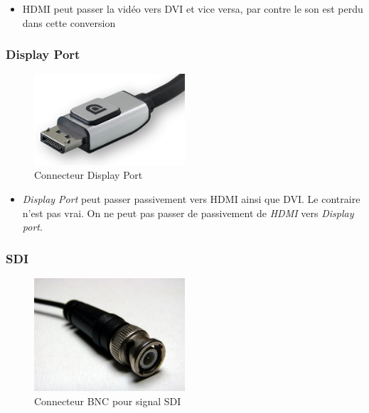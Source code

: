 \documentclass[
  french,
]{book}
\providecommand{\tightlist}{%
  \setlength{\itemsep}{0pt}\setlength{\parskip}{0pt}}
\begin{document}
\begin{itemize}
\tightlist
\item
  HDMI peut passer la vidéo vers DVI et vice versa, par contre le son est perdu dans cette conversion
\end{itemize}

\hypertarget{display-port}{%
\subsubsection{Display Port}\label{display-port}}

\begin{figure}
\centering
\includegraphics[width=0.5\textwidth,height=\textheight]{medias/lexique/signaux/numerique/displayport.jpg}
\caption{Connecteur Display Port}
\end{figure}

\begin{itemize}
\tightlist
\item
  \emph{Display Port} peut passer passivement vers HDMI ainsi que DVI. Le contraire n'est pas vrai. On ne peut pas passer de passivement de \emph{HDMI} vers \emph{Display port}.
\end{itemize}

\hypertarget{sdi}{%
\subsubsection{SDI}\label{sdi}}

\begin{figure}
\centering
\includegraphics[width=0.5\textwidth,height=\textheight]{medias/lexique/signaux/numerique/sdi.jpg}
\caption{Connecteur BNC pour signal SDI}
\end{figure}
\end{document}
